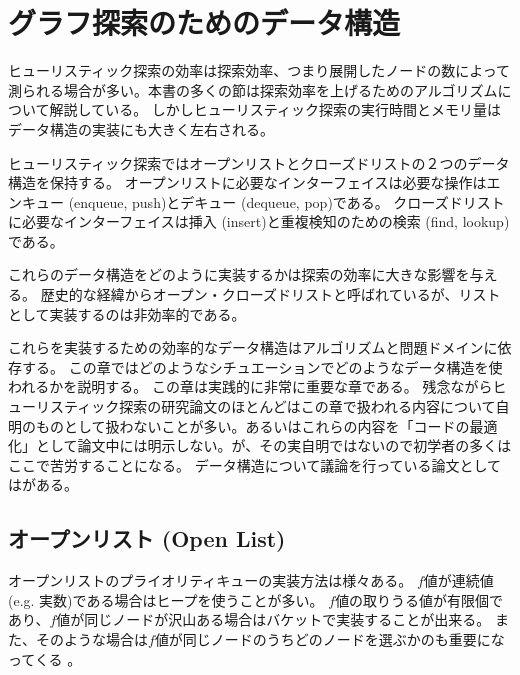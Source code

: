 \chapter{グラフ探索のためのデータ構造}
\label{ch:search-performance}

ヒューリスティック探索の効率は探索効率、つまり展開したノードの数によって測られる場合が多い。本書の多くの節は探索効率を上げるためのアルゴリズムについて解説している。
しかしヒューリスティック探索の実行時間とメモリ量はデータ構造の実装にも大きく左右される。

ヒューリスティック探索ではオープンリストとクローズドリストの２つのデータ構造を保持する。
オープンリストに必要なインターフェイスは必要な操作はエンキュー (enqueue, push)とデキュー (dequeue, pop)である。
クローズドリストに必要なインターフェイスは挿入 (insert)と重複検知のための検索 (find, lookup)である。

これらのデータ構造をどのように実装するかは探索の効率に大きな影響を与える。
歴史的な経緯からオープン・クローズドリストと呼ばれているが、リストとして実装するのは非効率的である。

これらを実装するための効率的なデータ構造はアルゴリズムと問題ドメインに依存する。
この章ではどのようなシチュエーションでどのようなデータ構造を使われるかを説明する。
この章は実践的に非常に重要な章である。
残念ながらヒューリスティック探索の研究論文のほとんどはこの章で扱われる内容について自明のものとして扱わないことが多い。あるいはこれらの内容を「コードの最適化」として論文中には明示しない。が、その実自明ではないので初学者の多くはここで苦労することになる。
データ構造について議論を行っている論文としては\cite{burns2012implementing}がある。




\section{オープンリスト (Open List)}
\label{sec:open-list}
オープンリストのプライオリティキューの実装方法は様々ある。
$f$値が連続値 (e.g. 実数)である場合はヒープを使うことが多い。
$f$値の取りうる値が有限個であり、$f$値が同じノードが沢山ある場合はバケットで実装することが出来る。
また、そのような場合は$f$値が同じノードのうちどのノードを選ぶかのも重要になってくる \cite{asai2016tiebreaking}。


